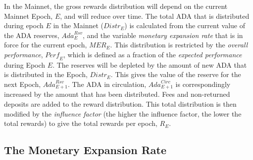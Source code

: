 \documentclass[11pt,a4paper,dvipsnames,twosided,final]{article}
\newcommand{\khcomment}[1]{\todo[color=blue!20]{KH: #1}}
\newcommand{\ada}{ADA{}}
\begin{document}
\noindent
In the Mainnet, the gross rewards distribution will depend on the current Mainnet Epoch, $E$, and will reduce over time.
The total \ada{} that is distributed during epoch $E$ in the Mainnet (${\textit{Distr}}_E$) is calculated from the current
value of the \ada{} reserves, $\textit{Ada}^{\textit{Rsv}}_E$, and the variable \emph{monetary expansion rate} that is in force for
the current epoch, $\textit{MER}_E$.
%
This distribution is restricted by the \emph{overall performance}, $\textit{Perf}_E$, which is defined as a fraction of the \emph{expected performance} during Epoch $E$.
%
The reserves will be depleted by the amount of new \ada{} that is distributed in the Epoch, $\textit{Distr}_E$. This gives the
value of the reserve for the next Epoch, $\textit{Ada}^{\textit{Rsv}}_{E+1}$.  The \ada{} in circulation, $\textit{Ada}^{\textit{Circ}}_{E+1}$
is correspondingly increased by the amount that has been distributed.
%
Fees and non-returned deposits are added to the reward distribution.  This total distribution is then modified by the \emph{influence factor}
(the higher the influence factor, the lower the total rewards) to give the total rewards per epoch, $R_E$.

%

\subsection{The Monetary Expansion Rate}
\label{sec:expansion}
\end{document}
